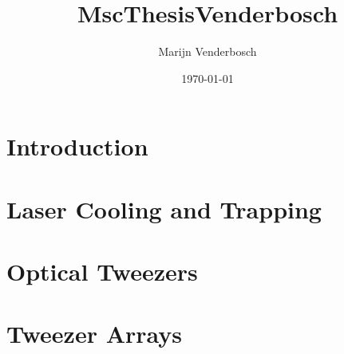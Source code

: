 \documentclass[a4paper, twoside, notitlepage, 10pt]{report}
\title{MscThesisVenderbosch}
\author{Marijn Venderbosch}
\date{\normalsize \textsf{\today}}
\begin{document}

\clearpage

    \hspace{0pt}
    \vfill
        \renewcommand{\abstractname}{\Large{Abstract}}
        \begin{abstract}
            \thispagestyle{plain}
            \vspace*{0.5cm}
            \normalsize
            
        \end{abstract}
    \vfill
    \vspace{100pt}
    \clearpage
    
    \hspace{0pt}
    \vfill
        \renewcommand{\abstractname}{\Large{Acknowledgments}}
        \begin{abstract}
            \thispagestyle{plain}
            \vspace*{0.5cm}
            \normalsize
            
        \end{abstract}
    \vfill
    \vspace{100pt}
\restoregeometry


\tableofcontents
\newpage


\newpage


\chapter{Introduction}\label{ch:introduction}
    

\chapter{Laser Cooling and Trapping}\label{ch:coolingtrapping}
    

\chapter{Optical Tweezers}\label{ch:tweezer}
    

\chapter{Tweezer Arrays}\label{ch:arrays}
    
    
\end{document}
